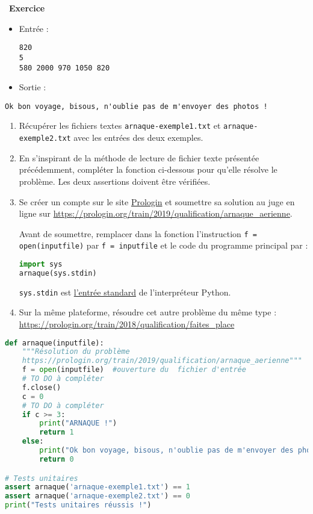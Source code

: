 \documentclass[
  10pt,
]{article}
\newcommand{\passthrough}[1]{#1}
\newcounter{exo}
\newenvironment{exercice}[1]
{\par \medskip   \addtocounter{exo}{1} \noindent  
\begin{bclogo}[arrondi =0.1,   noborder = true, logo=\bccrayon, marge=4]{~\textbf{Exercice} \textbf{\theexo} {\itshape #1} }  \par}
{
\end{bclogo}
 \par \bigskip }
\newcounter{def}
\newcounter{prog}
\newcounter{logi}
\begin{document}
\begin{exercice}{}
\begin{itemize}
  \begin{itemize}
  \item
    Entrée :

\begin{lstlisting}
820
5
580 2000 970 1050 820
\end{lstlisting}
  \item
    Sortie :
  \end{itemize}

\begin{lstlisting}
Ok bon voyage, bisous, n'oublie pas de m'envoyer des photos !
\end{lstlisting}
\end{itemize}

\begin{enumerate}
\def\labelenumi{\arabic{enumi}.}
\item
  Récupérer les fichiers textes
  \passthrough{\lstinline!arnaque-exemple1.txt!} et
  \passthrough{\lstinline!arnaque-exemple2.txt!} avec les entrées des
  deux exemples.
\item
  En s'inspirant de la méthode de lecture de fichier texte présentée
  précédemment, compléter la fonction ci-dessous pour qu'elle résolve le
  problème. Les deux assertions doivent être vérifiées.
\item
  Se créer un compte sur le site
  \href{https://prologin.org/user/register?next=\%2F}{Prologin} et
  soumettre sa solution au juge en ligne sur
  \url{https://prologin.org/train/2019/qualification/arnaque_aerienne}.

  Avant de soumettre, remplacer dans la fonction l'instruction
  \passthrough{\lstinline!f = open(inputfile)!} par
  \passthrough{\lstinline!f = inputfile!} et le code du programme
  principal par :

\begin{lstlisting}[language=Python]
import sys
arnaque(sys.stdin)
\end{lstlisting}

  \passthrough{\lstinline!sys.stdin!} est
  \href{https://docs.python.org/fr/3/library/sys.html\#sys.stdin}{l'entrée
  standard} de l'interpréteur Python.
\item
  Sur la même plateforme, résoudre cet autre problème du même type :
  \url{https://prologin.org/train/2018/qualification/faites_place}
\end{enumerate}

\begin{lstlisting}[language=Python]
def arnaque(inputfile):
    """Résolution du problème 
    https://prologin.org/train/2019/qualification/arnaque_aerienne"""
    f = open(inputfile)  #ouverture du  fichier d'entrée
    # TO DO à compléter
    f.close() 
    c = 0
    # TO DO à compléter
    if c >= 3:
        print("ARNAQUE !")
        return 1
    else:
        print("Ok bon voyage, bisous, n'oublie pas de m'envoyer des photos !")
        return 0

# Tests unitaires        
assert arnaque('arnaque-exemple1.txt') == 1
assert arnaque('arnaque-exemple2.txt') == 0
print("Tests unitaires réussis !")
\end{lstlisting}

\end{exercice}
\end{document}
